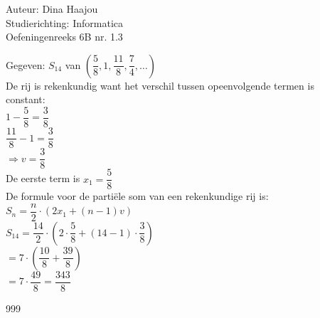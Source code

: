 \documentclass[a4paper]{article}
\begin{document}
\normalsize

\noindent \large Auteur: Dina Haajou \\
\noindent \large Studierichting: Informatica \\
\noindent \large Oefeningenreeks 6B nr. 1.3 \\

\medskip

\normalsize

Gegeven: $S_{14}$ van $\left( \dfrac{5}{8}, 1, \dfrac{11}{8}, \dfrac{7}{4}, \ldots \right)$ \\

De rij is rekenkundig want het verschil tussen opeenvolgende termen is \\ 

constant: \\

$1 - \dfrac{5}{8} = \dfrac{3}{8}$ \\

$\dfrac{11}{8} - 1 = \dfrac{3}{8}$ \\

$\Rightarrow v = \dfrac{3}{8}$ \\

De eerste term is $x_1 = \dfrac{5}{8}$ \\

De formule voor de partiële som van een rekenkundige rij is: \\

$S_n = \dfrac{n}{2} \cdot (2x_1 + (n - 1)v)$ \\

$S_{14} = \dfrac{14}{2} \cdot \left(2 \cdot \dfrac{5}{8} + (14 - 1) \cdot \dfrac{3}{8} \right)$ \\

$= 7 \cdot \left( \dfrac{10}{8} + \dfrac{39}{8} \right)$ \\

$= 7 \cdot \dfrac{49}{8} = \dfrac{343}{8}$

\begin{thebibliography}{999}
\end{thebibliography}
\end{document}
